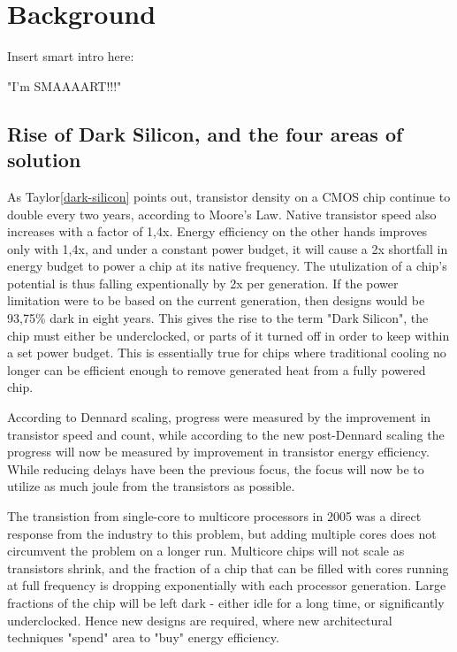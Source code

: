 \chapter{Background}
\label{cha:background}

Insert smart intro here:

"I'm SMAAAART!!!"

\section{Rise of Dark Silicon, and the four areas of solution}
\label{sec:dark-silicon}
As Taylor\ref{dark-silicon} points out, transistor density on a CMOS chip continue to double every two years, according to Moore's Law.
Native transistor speed also increases with a factor of 1,4x.
Energy efficiency on the other hands improves only with 1,4x, and under a constant power budget, it will cause a 2x shortfall in energy budget to power a chip at its native frequency.
The utulization of a chip's potential is thus falling expentionally by 2x per generation.
If the power limitation were to be based on the current generation, then designs would be 93,75\% dark in eight years.
This gives the rise to the term "Dark Silicon", the chip must either be underclocked, or parts of it turned off in order to keep within a set power budget.
This is essentially true for chips where  traditional cooling no longer can be efficient enough to remove generated heat from a fully powered chip.

According to Dennard scaling, progress were measured by the improvement in transistor speed and count, while according to the new post-Dennard scaling the progress will now be measured by improvement in transistor energy efficiency.
While reducing delays have been the previous focus, the focus will now be to utilize as much joule from the transistors as possible.

The transistion from single-core to multicore processors in 2005 was a direct response from the industry to this problem, but adding multiple cores does not circumvent the problem on a longer run.
Multicore chips will not scale as transistors shrink, and the fraction of a chip that can be filled with cores running at full frequency is dropping exponentially with each processor generation. 
Large fractions of the chip will be left dark - either idle for a long time, or significantly underclocked.
Hence new designs are required, where new architectural techniques "spend" area to "buy" energy efficiency.

